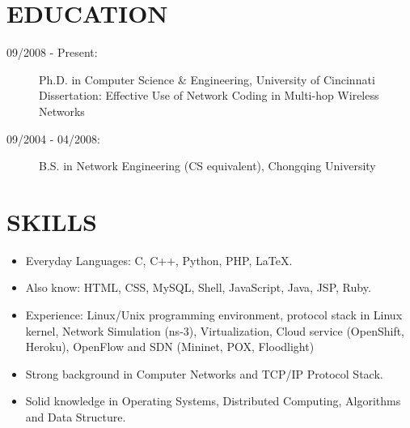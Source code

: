 \documentclass[line]{res}
\begin{document}
\address{226 Ludlow Ave Apt 11 \\ Cincinnati, OH 45220 \\ 513-679-0772}
\address{Email: \href{mailto:yang@yangchi.me}{yang@yangchi.me} \\ Github: \url{https://github.com/yangchi} }

\begin{resume}
	\section{EDUCATION}
	\begin{description}
		\item[09/2008 - Present:] Ph.D. in Computer Science \& Engineering, University of Cincinnati\\
			Dissertation: Effective Use of Network Coding in Multi-hop Wireless Networks
		\item[09/2004 - 04/2008:] B.S. in Network Engineering (CS equivalent), Chongqing University
	\end{description}
	
	\section{SKILLS}
	\begin{itemize}
		\item Everyday Languages: C, C++, Python, PHP, LaTeX.
		\item Also know: HTML, CSS, MySQL, Shell, JavaScript, Java, JSP, Ruby.
		\item Experience: Linux/Unix programming environment, protocol stack in Linux kernel, Network Simulation (ns-3), Virtualization, Cloud service (OpenShift, Heroku), OpenFlow and SDN (Mininet, POX, Floodlight)
		\item Strong background in Computer Networks and TCP/IP Protocol Stack.
		\item Solid knowledge in Operating Systems, Distributed Computing, Algorithms and Data Structure.
	\end{itemize}


\end{resume}
\end{document}
